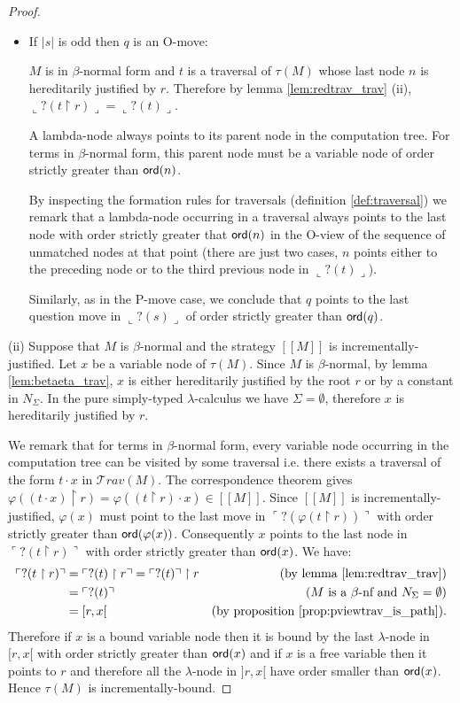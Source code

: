 \documentclass{llncs}
\newcommand\travset{\mathcal{T}rav}
\newcommand\ord[1]{{\sf ord}(#1)}
\newcommand{\lsem}{[\![} %
\newcommand{\rsem}{]\!]} %
\newcommand{\sem}[1]{{\lsem #1 \rsem}}
\newcommand{\oview}[1]{\llcorner #1 \lrcorner}
\newcommand{\pview}[1]{\ulcorner #1 \urcorner}
\begin{document}
\begin{proof}
\begin{itemize}
\item If $|s|$ is odd then $q$ is an O-move:

$M$ is in $\beta$-normal form and $t$ is a traversal of $\tau(M)$
whose last node $n$ is hereditarily justified by $r$. Therefore by
lemma \ref{lem:redtrav_trav} (ii), $ \oview{?(t \upharpoonright r)}
= \oview{?(t)}$.

A lambda-node always points to its parent node in the computation
tree. For terms in $\beta$-normal form, this parent node must be a
variable node of order strictly greater than $\ord{n}$.

By inspecting the formation rules for traversals (definition
\ref{def:traversal}) we remark that a lambda-node occurring in a
traversal always points to the last node with order strictly greater
that $\ord{n}$ in the O-view of the sequence of unmatched nodes at
that point (there are just two cases, $n$ points either to the
preceding node or to the third previous node in $\oview{?(t)}$).

Similarly, as in the P-move case, we conclude that $q$ points to the
last question move in $\oview{?(s)}$ of order strictly greater than
$\ord{q}$.
\end{itemize}

\noindent (ii) Suppose that $M$ is $\beta$-normal and the strategy
$\sem{M}$ is incrementally-justified. Let $x$ be a variable node of
$\tau(M)$. Since $M$ is $\beta$-normal, by lemma
\ref{lem:betaeta_trav}, $x$ is either hereditarily justified by the
root $r$ or by a constant in $N_\Sigma$. In the pure simply-typed
$\lambda$-calculus we have $\Sigma=\emptyset$, therefore $x$ is
hereditarily justified by $r$.


We remark that for terms in $\beta$-normal form, every variable node
occurring in the computation tree can be visited by some traversal
i.e. there exists a traversal of the form $t \cdot x$ in
$\travset(M)$. The correspondence theorem gives $\varphi((t \cdot x)
\upharpoonright r) = \varphi((t \upharpoonright r) \cdot x) \in
\sem{M}$. Since $\sem{M}$ is incrementally-justified, $\varphi(x)$
must point to the last move in $\pview{?(\varphi(t \upharpoonright
r))}$ with order strictly greater than $\ord{\varphi(x)}$.
Consequently $x$ points to the last node in $\pview{?(t
\upharpoonright r)}$ with order strictly greater than $\ord{x}$. We
have:
\begin{align*}
\pview{?(t \upharpoonright r)} &= \pview{?(t) \upharpoonright r} = \pview{?(t)} \upharpoonright r & (\mbox{by lemma \ref{lem:redtrav_trav}}) \\
& = \pview{?(t)} & (\mbox{$M$ is a $\beta$-nf and $N_\Sigma = \emptyset$}) \\
& = [r,x[ & (\mbox{by proposition \ref{prop:pviewtrav_is_path}}).
\end{align*}
Therefore if $x$ is a bound variable node then it is bound by the
last $\lambda$-node in $[r,x[$ with order strictly greater than
$\ord{x}$ and if $x$ is a free variable then it points to $r$ and
therefore all the $\lambda$-node in $]r,x[$ have order smaller than
$\ord{x}$. Hence $\tau(M)$ is incrementally-bound.
\end{proof}
\end{document}
